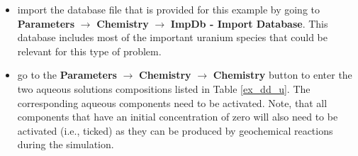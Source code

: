 \begin{itemize}
\item import the database file that is provided for this example by going to
{\color{blue}\textbf{Parameters}}
$\rightarrow$ {\color{blue}\textbf{Chemistry}} 
$\rightarrow$ {\color{blue}\textbf{ImpDb - Import Database}}. 
This database includes most of the important uranium species 
that could be relevant for this type of problem. 
\item go to the
{\color{blue}\textbf{Parameters}}
$\rightarrow$ {\color{blue}\textbf{Chemistry}} 
$\rightarrow$ {\color{blue}\textbf{Chemistry}} 
button to enter the two aqueous solutions compositions 
listed in Table \ref{ex_dd_u}. The corresponding aqueous components 
need to be activated. Note, that all components that have an
initial concentration of zero will also need to be activated (i.e., ticked)
as they can be produced by geochemical reactions during the simulation.
\end{itemize}

